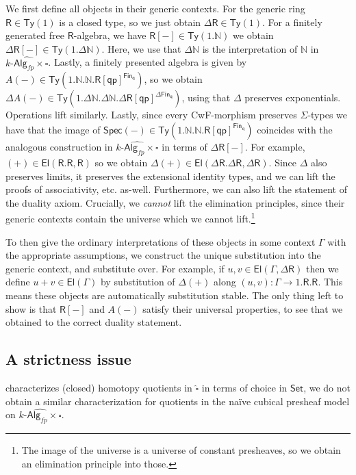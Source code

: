 \documentclass[10pt,a4paper]{article}
\newcommand{\nats}{\mathbb{N}}
\newcommand{\Set}{\mathsf{Set}}
\newcommand{\Alg}{\mathsf{Alg}}
\newcommand\Ty{\mathsf{Ty}}
\newcommand\El{\mathsf{El}}
\newcommand\p{\mathsf{p}}
\newcommand\q{\mathsf{q}}
\newcommand\R{\mathsf{R}}
\newcommand\Spec{\mathsf{Spec}}
\begin{document}
We first define all objects in their generic contexts.
For the generic ring $\R \in \Ty(1)$ is a closed type, so we just obtain $\Delta\R \in \Ty(1)$.
For a finitely generated free $\R$-algebra, we have $\R[-] \in \Ty(1.\nats)$ we obtain $\Delta\R[-] \in \Ty(1.\Delta\nats)$.
Here, we use that $\Delta\nats$ is the interpretation of $\nats$ in $\widehat{k\text{-}\Alg_{fp} \times \square}$.
Lastly, a finitely presented algebra is given by $A(-) \in \Ty(1.\nats.\nats.{\R[\q\p]}^{\mathsf{Fin}_\q})$, so we obtain $\Delta A(-) \in \Ty(1.\Delta\nats.\Delta\nats.\Delta\R[\q\p]^{\Delta\mathsf{Fin}_\q})$, using that $\Delta$ preserves exponentials.
Operations lift similarly.
Lastly, since every CwF-morphism preserves $\Sigma$-types we have that the image of $\Spec(-) \in \Ty(1.\nats.\nats.{\R[\q\p]}^{\mathsf{Fin}_\q})$ coincides with the analogous construction in $\widehat{k\text{-}\Alg_{fp} \times \square}$ in terms of $\Delta\R[-]$.
For example, $(+) \in \El(\R.\R, \R)$ so we obtain $\Delta(+) \in \El(\Delta\R.\Delta\R, \Delta\R)$.
Since $\Delta$ also preserves limits, it preserves the extensional identity types, and we can lift the proofs of associativity, etc. as-well.
Furthermore, we can also lift the statement of the duality axiom.
Crucially, we \emph{cannot} lift the elimination principles, since their generic contexts contain the universe which we cannot lift.\footnote{The image of the universe is a universe of constant presheaves, so we obtain an elimination principle into those.} 

To then give the ordinary interpretations of these objects in some context $\Gamma$ with the appropriate assumptions, we construct the unique substitution into the generic context, and substitute over.
For example, if $u, v \in \El(\Gamma, \Delta \R)$ then we define $u + v \in \El(\Gamma)$ by  substitution of $\Delta(+)$ along $(u, v) \colon \Gamma \to 1.\R.\R$.
This means these objects are automatically substitution stable.
The only thing left to show is that $\R[-]$ and $A(-)$ satisfy their universal properties, to see that we obtained to the correct duality statement.


\subsection{A strictness issue}

  characterizes (closed) homotopy quotients in $\widehat\square$ in terms of choice in $\Set$, we do not obtain a similar characterization for quotients in the na\"ive cubical presheaf model on $\widehat{k\text{-}\Alg_{fp} \times \square}$.
\end{document}
